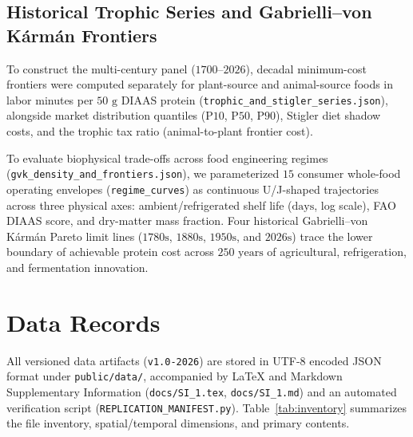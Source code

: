 \documentclass[11pt,a4paper]{article}
\begin{document}
\subsection{Historical Trophic Series and Gabrielli--von K\'arm\'an Frontiers}
To construct the multi-century panel ($1700\text{--}2026$), decadal minimum-cost frontiers were computed separately for plant-source and animal-source foods in labor minutes per $50\text{ g}$ DIAAS protein (\texttt{trophic\_and\_stigler\_series.json}), alongside market distribution quantiles ($\text{P10}$, $\text{P50}$, $\text{P90}$), Stigler diet shadow costs, and the trophic tax ratio (animal-to-plant frontier cost).

To evaluate biophysical trade-offs across food engineering regimes (\texttt{gvk\_density\_and\_frontiers.json}), we parameterized $15$ consumer whole-food operating envelopes (\texttt{regime\_curves}) as continuous U/J-shaped trajectories across three physical axes: ambient/refrigerated shelf life ($\text{days}$, log scale), FAO DIAAS score, and dry-matter mass fraction. Four historical Gabrielli--von K\'arm\'an Pareto limit lines ($1780\text{s}$, $1880\text{s}$, $1950\text{s}$, and $2026\text{s}$) trace the lower boundary of achievable protein cost across $250\text{ years}$ of agricultural, refrigeration, and fermentation innovation.

\section{Data Records}

All versioned data artifacts (\texttt{v1.0-2026}) are stored in UTF-8 encoded JSON format under \texttt{public/data/}, accompanied by LaTeX and Markdown Supplementary Information (\texttt{docs/SI\_1.tex}, \texttt{docs/SI\_1.md}) and an automated verification script (\texttt{REPLICATION\_MANIFEST.py}). Table~\ref{tab:inventory} summarizes the file inventory, spatial/temporal dimensions, and primary contents.
\end{document}
